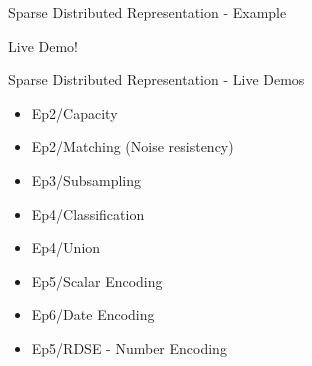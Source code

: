 \begin{frame}[c]{Sparse Distributed Representation - Example}
\end{frame}


\begin{frame}[c,standout]
    Live Demo!
\end{frame}


\begin{frame}[c]{Sparse Distributed Representation - Live Demos}
    \Large
    \begin{itemize}[<+(1)->]
        \item Ep2/Capacity
        \item Ep2/Matching (Noise resistency)
        \item Ep3/Subsampling
        \item Ep4/Classification
        \item Ep4/Union
        \item Ep5/Scalar Encoding
        \item Ep6/Date Encoding
        \item Ep5/RDSE - Number Encoding
    \end{itemize}
\end{frame}


